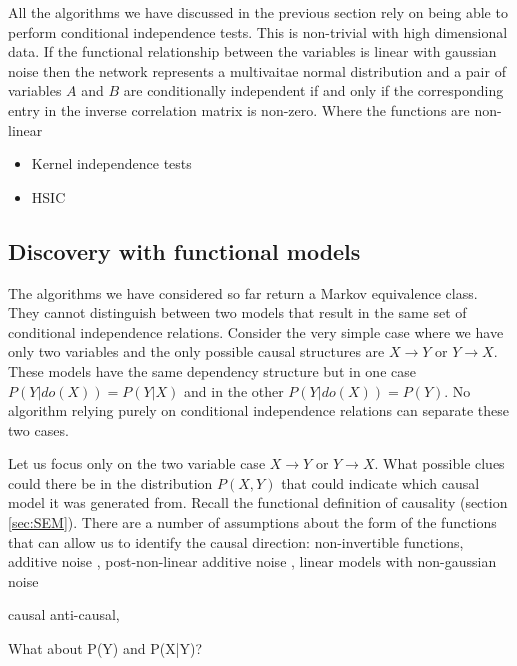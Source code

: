\documentclass[11pt,a4paper,oneside]{book}
\begin{document}
All the algorithms we have discussed in the previous section rely on being able to perform conditional independence tests. This is non-trivial with high dimensional data. If the functional relationship between the variables is linear with gaussian noise then the network represents a multivaitae normal distribution and a pair of variables $A$ and $B$ are conditionally independent if and only if the corresponding entry in the inverse correlation matrix is non-zero. Where the functions are non-linear 

\begin{itemize}
\item \cite{Zhang2012} Kernel independence tests
\item HSIC \cite{Gretton2008}
\end{itemize}

\subsection*{Discovery with functional models}
The algorithms we have considered so far return a Markov equivalence class. They cannot distinguish between two models that result in the same set of conditional independence relations. Consider the very simple case where we have only two variables and the only possible causal structures are $X \rightarrow Y$ or $Y \rightarrow X$. These models have the same dependency structure but in one case $P(Y|do(X)) = P(Y|X)$ and in the other $P(Y|do(X)) = P(Y)$. No algorithm relying purely on conditional independence relations can separate these two cases. 

Let us focus only on the two variable case $X \rightarrow Y$ or $Y \rightarrow X$. What possible clues could there be in the distribution $P(X,Y)$ that could indicate which causal model it was generated from. Recall the functional definition of causality (section \ref{sec:SEM}). There are a number of assumptions about the form of the functions that can allow us to identify the causal direction: non-invertible functions, additive noise \cite{Hoyer2009}, post-non-linear additive noise \cite{Zhang2008a}, linear models with non-gaussian noise \cite{Hoyer2012}


causal anti-causal, 

What about P(Y) and P(X|Y)?

\end{document}
